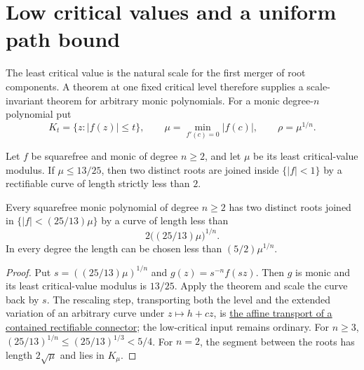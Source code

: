 \documentclass[11pt]{article}
\begin{document}
\section{Low critical values and a uniform path bound}
\label{sec:constant-factor}

The least critical value is the natural scale for the first merger of root
components.  A theorem at one fixed critical level therefore supplies a
scale-invariant theorem for arbitrary monic polynomials.  For a monic
degree-$n$ polynomial put
\[
 K_t=\{z:|f(z)|\le t\},\qquad
 \mu=\min_{f'(c)=0}|f(c)|,\qquad \rho=\mu^{1/n}.
\]

\begin{theorem}
\label{res:low-critical-thirteen-twentyfifths}
Let $f$ be squarefree and monic of degree $n\ge2$, and let $\mu$ be its least
critical-value modulus.  If $\mu\le13/25$, then two distinct roots are joined
inside $\{|f|<1\}$ by a rectifiable curve of length strictly less than $2$.
\end{theorem}

\begin{corollary}
\label{res:scaled-low-critical}
Every squarefree monic polynomial of degree $n\ge2$ has two distinct roots
joined in $\{|f|<(25/13)\mu\}$ by a curve of length less than
\[
 2\bigl((25/13)\mu\bigr)^{1/n}.
\]
In every degree the length can be chosen less than $(5/2)\mu^{1/n}$.
\end{corollary}

\begin{proof}
Put $s=((25/13)\mu)^{1/n}$ and $g(z)=s^{-n}f(sz)$.  Then $g$ is monic and
its least critical-value modulus is $13/25$.  Apply the theorem and scale the
curve back by $s$.  The rescaling step, transporting both the level and the
extended variation of an arbitrary curve under $z\mapsto h+cz$, is
\href{https://github.com/wcook04/plectis-erdos/blob/f36a98bf3d3e6f65f1074e3b800e3293d5b8a51a/ErdosProblems/Erdos1041/PaperMetricScaling.lean#L40}{the affine
transport of a contained rectifiable connector}; the low-critical input remains
ordinary.  For $n\ge3$,
$(25/13)^{1/n}\le(25/13)^{1/3}<5/4$.  For $n=2$, the segment between the
roots has length $2\sqrt\mu$ and lies in $K_\mu$.
\end{proof}
\end{document}
